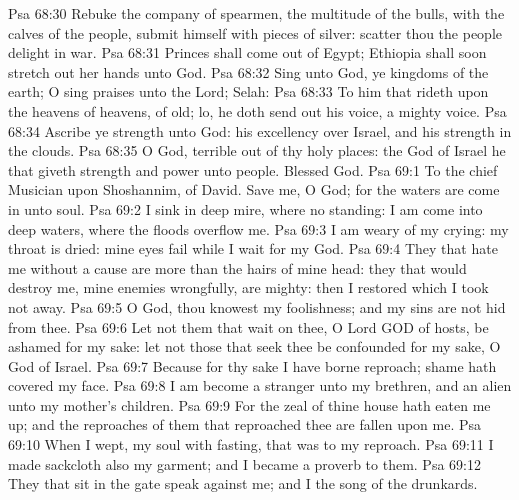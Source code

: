 \vs Psa 68:30 Rebuke the company of spearmen, the multitude of the bulls, with the calves of the people,  submit himself with pieces of silver: scatter thou the people  delight in war.
\vs Psa 68:31 Princes shall come out of Egypt; Ethiopia shall soon stretch out her hands unto God.
\vs Psa 68:32 Sing unto God, ye kingdoms of the earth; O sing praises unto the Lord; Selah:
\vs Psa 68:33 To him that rideth upon the heavens of heavens,  of old; lo, he doth send out his voice,  a mighty voice.
\vs Psa 68:34 Ascribe ye strength unto God: his excellency  over Israel, and his strength  in the clouds.
\vs Psa 68:35 O God,  terrible out of thy holy places: the God of Israel  he that giveth strength and power unto  people. Blessed  God.
\vs Psa 69:1 To the chief Musician upon Shoshannim,  of David. Save me, O God; for the waters are come in unto  soul.
\vs Psa 69:2 I sink in deep mire, where  no standing: I am come into deep waters, where the floods overflow me.
\vs Psa 69:3 I am weary of my crying: my throat is dried: mine eyes fail while I wait for my God.
\vs Psa 69:4 They that hate me without a cause are more than the hairs of mine head: they that would destroy me,  mine enemies wrongfully, are mighty: then I restored  which I took not away.
\vs Psa 69:5 O God, thou knowest my foolishness; and my sins are not hid from thee.
\vs Psa 69:6 Let not them that wait on thee, O Lord GOD of hosts, be ashamed for my sake: let not those that seek thee be confounded for my sake, O God of Israel.
\vs Psa 69:7 Because for thy sake I have borne reproach; shame hath covered my face.
\vs Psa 69:8 I am become a stranger unto my brethren, and an alien unto my mother's children.
\vs Psa 69:9 For the zeal of thine house hath eaten me up; and the reproaches of them that reproached thee are fallen upon me.
\vs Psa 69:10 When I wept,  my soul with fasting, that was to my reproach.
\vs Psa 69:11 I made sackcloth also my garment; and I became a proverb to them.
\vs Psa 69:12 They that sit in the gate speak against me; and I  the song of the drunkards.
